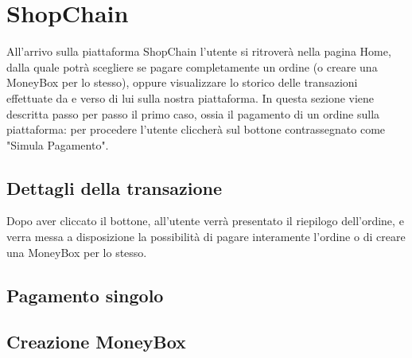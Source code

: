 \section{ShopChain}

All'arrivo sulla piattaforma ShopChain l'utente si ritroverà nella pagina Home,
 dalla quale potrà scegliere se pagare completamente un ordine (o creare una MoneyBox per lo stesso),
 oppure visualizzare lo storico delle transazioni effettuate da e verso di lui sulla nostra piattaforma.
In questa sezione viene descritta passo per passo il primo caso, ossia il pagamento di un ordine sulla piattaforma: 
per procedere l'utente cliccherà sul bottone contrassegnato come "Simula Pagamento".


\subsection{Dettagli della transazione}

Dopo aver cliccato il bottone, all'utente verrà presentato il riepilogo dell'ordine, e verra messa a disposizione la possibilità
 di pagare interamente l'ordine o di creare una MoneyBox per lo stesso.


\subsection{Pagamento singolo}



\subsection{Creazione MoneyBox}

